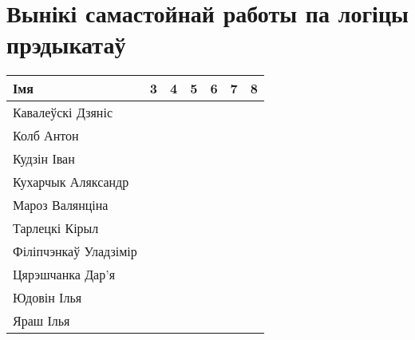 


	\section{Вынікі самастойнай работы па логіцы прэдыкатаў}
\begin{table}[H]
	\begin{tabular}{|l|c|c|c|c|c|c|}
		\hline
		Імя                     & 3  & 4   & 5   & 6  & 7   & 8  \\ \hline
		Кавалеўскі Дзяніс        &    &     &     &    &     &    \\ \hline
		Колб Антон        &    &     &     &    &     &    \\ \hline
		Кудзін Іван     &    &     &     &    &     &    \\ \hline
		Кухарчык Аляксандр           &    &     &     &    &     &    \\ \hline
		Мароз Валянціна      &    &     &     &    &     &    \\ \hline
		Тарлецкі Кірыл        &    &     &     &    &     &    \\ \hline
		Філіпчэнкаў Уладзімір          &    &     &     &    &     &    \\ \hline
		Цярэшчанка Дар'я       &    &     &     &    &     &    \\ \hline
		Юдовін Ілья        &    &     &     &    &     &    \\ \hline
		Яраш Ілья        &    &     &     &    &     &    \\ \hline
	\end{tabular}
\end{table}

